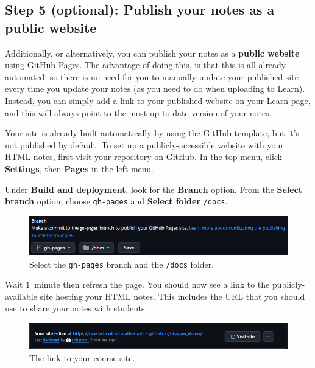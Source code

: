 \subsection{Step 5 (optional): Publish your notes as a public website}
\label{ssec:pub}

Additionally, or alternatively, you can publish your notes as a \textbf{public website} using GitHub Pages. The advantage of doing this, is that this is all already automated; so there is no need for you to manually update your published site every time you update your notes (as you need to do when uploading to Learn). Instead, you can simply add a link to your published website on your Learn page, and this will always point to the most up-to-date version of your notes.

Your site is already built automatically by using the GitHub template, but it's not published by default. To set up a publicly-accessible website with your HTML notes, first visit your repository on GitHub. In the top menu, click \textbf{Settings}, then \textbf{Pages} in the left menu.

Under \textbf{Build and deployment}, look for the \textbf{Branch} option. From the \textbf{Select branch} option, choose \texttt{gh-pages} and \textbf{Select folder} \texttt{/docs}.

\begin{figure}[h]
    \centering
    \includegraphics[width=\columnwidth]{img/GitHub-Pages.png}
    \caption{Select the \texttt{gh-pages} branch and the \texttt{/docs} folder.}
    \label{fig:gh-pages}
\end{figure}

Wait 1~minute then refresh the page. You should now see a link to the publicly-available site hosting your HTML notes. This includes the URL that you should use to share your notes with students.

\begin{figure}[h]
    \centering
    \includegraphics[width=\columnwidth]{img/GitHub-site-link.png}
    \caption{The link to your course site.}
    \label{fig:gh-site-link}
\end{figure}


